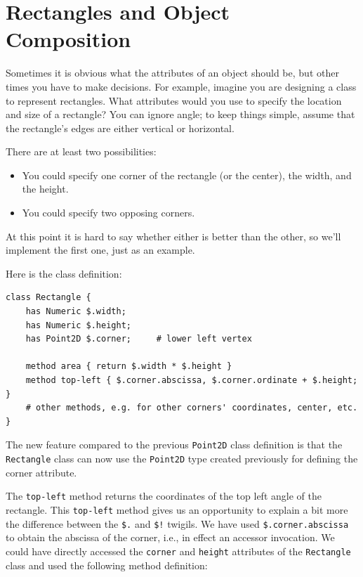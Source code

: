 \section{Rectangles and Object Composition}
\label{rectangles}

Sometimes it is obvious what the attributes of an object should be,
but other times you have to make decisions.  For example, imagine you
are designing a class to represent rectangles.  What attributes would
you use to specify the location and size of a rectangle?  You can
ignore angle; to keep things simple, assume that the rectangle's edges 
are either vertical or horizontal.

There are at least two possibilities: 

\begin{itemize}

\item You could specify one corner of the rectangle
(or the center), the width, and the height.

\item You could specify two opposing corners.

\end{itemize}

At this point it is hard to say whether either is better than
the other, so we'll implement the first one, just as an example.

Here is the class definition:

\begin{verbatim}
class Rectangle {
    has Numeric $.width;
    has Numeric $.height;
    has Point2D $.corner;     # lower left vertex 

    method area { return $.width * $.height }
    method top-left { $.corner.abscissa, $.corner.ordinate + $.height; }
    # other methods, e.g. for other corners' coordinates, center, etc.
}
\end{verbatim}
%
The new feature compared to the previous {\tt Point2D} class 
definition is that the \verb'Rectangle' class can now use the 
{\tt Point2D} type created previously for defining the corner 
attribute. 

The {\tt top-left} method returns the coordinates of 
the top left angle of the rectangle. This {\tt top-left} 
method gives us an opportunity to explain a bit more 
the difference between the \verb'$.' and \verb'$!' twigils. We have 
used \verb'$.corner.abscissa' to obtain the abscissa of 
the corner, i.e., in effect an accessor invocation. We could 
have directly accessed the {\tt corner} and {\tt height} 
attributes of the {\tt Rectangle} class and used the following 
method definition:

